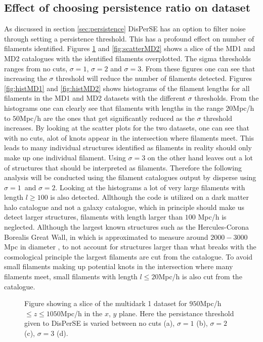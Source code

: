 \subsection{Effect of choosing persistence ratio on dataset}
As discussed in section \ref{sec:persistence} DisPerSE has an option to filter
noise through setting a persistence threshold. This has a profound effect on number of filaments identified. Figures \ref{fig:scatterMD1} and \ref{fig:scatterMD2} shows a slice of the MD1 and MD2 catalogues with the identified filaments overplotted. The sigma thresholds ranges from no cuts, $\sigma=1$, $\sigma=2$ and $\sigma=3$. From these figures one can see that increasing the $\sigma$ threshold will reduce the number of filaments detected. Figures \ref{fig:histMD1} and \ref{fig:histMD2} shows histograms of the filament lengths for all filaments in the MD1 and MD2 datasets with the different $\sigma$ thresholds. From the histograms one can clearly see that filaments with lengths in the range $20$Mpc/h to $50$Mpc/h are the ones that get significantly reduced as the $\sigma$ threshold increases. By looking at the scatter plots for the two datasets, one can see that with no cuts, alot of knots appear in the intersection where filaments meet. This leads to many individual structures identified as filaments in reality should only make up one individual filament. Using $\sigma=3$ on the other hand leaves out a lot of structures that should be interpreted as filaments. Therefore the following analysis will be conducted using the filament catalogues output by disperse using $\sigma=1$ and $\sigma=2$. Looking at the histograms a lot of very large filaments with length $l\geq 100$ is also detected. Allthough the code is utilized on a dark matter halo catalogue and not a galaxy catalogue, which in principle should make us detect larger structures, filaments with length larger than $100$ Mpc/h is neglected. Allthough the largest known structures such as the Hercules-Corona Borealis Great Wall, in which is approximated to measure around $2000-3000$Mpc in diameter \cite{herculescorona}, to not account for structures larger than what breaks with the cosmological principle the largest filaments are cut from the catalogue. To avoid small filaments making up potential knots in the intersection where many filaments meet, small filaments with length $l\leq 20$Mpc/h is also cut from the catalogue.
\begin{figure}[H]
    \hspace{1em}%
    \hspace{1em}%
    \caption{Figure showing a slice of the multidark 1 dataset for $950$Mpc/h$\leq z\leq1050$Mpc/h in the $x$, $y$ plane. Here the persistance threshold given to DisPerSE is varied between no cuts (a), $\sigma=1$ (b), $\sigma=2$ (c), $\sigma=3$ (d).}
    \label{fig:scatterMD1}
\end{figure}

